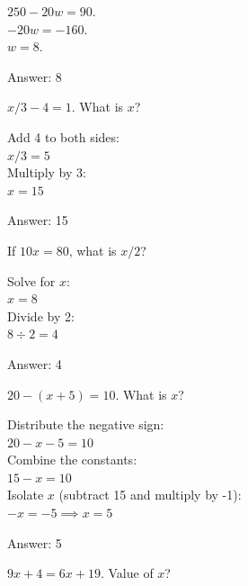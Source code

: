 \documentclass[11pt,paper=a4,answers]{exam}
\begin{document}
\begin{questions}
\begin{solution}
$250 - 20w = 90$. 
\\[10pt]
$-20w = -160$. 
\\[10pt]
$w = 8$.

\vspace{20pt}
Answer: \colorbox{yellow!100}{8}
\end{solution}

\question
$x/3 - 4 = 1$. What is $x$?

\begin{solution}
Add 4 to both sides:
\\[10pt]
$x/3 = 5$ 
\\[10pt]
Multiply by 3:
\\[10pt]
$x = 15$

\vspace{20pt}
Answer: \colorbox{yellow!100}{15}
\end{solution}

\question
If $10x = 80$, what is $x/2$?

\begin{solution}
Solve for $x$:
\\[10pt]
$x = 8$ 
\\[10pt]
Divide by 2:
\\[10pt]
$8 \div 2 = 4$

\vspace{20pt}
Answer: \colorbox{yellow!100}{4}
\end{solution}

\question
$20 - (x + 5) = 10$. What is $x$?

\begin{solution}
Distribute the negative sign:
\\[10pt]
$20 - x - 5 = 10$ 
\\[10pt]
Combine the constants:
\\[10pt]
$15 - x = 10$ 
\\[10pt]
Isolate $x$ (subtract 15 and multiply by -1):
\\[10pt]
$-x = -5 \implies x = 5$

\vspace{20pt}
Answer: \colorbox{yellow!100}{5}
\end{solution}

\question
$9x + 4 = 6x + 19$. Value of $x$?


\end{questions}
\end{document}
